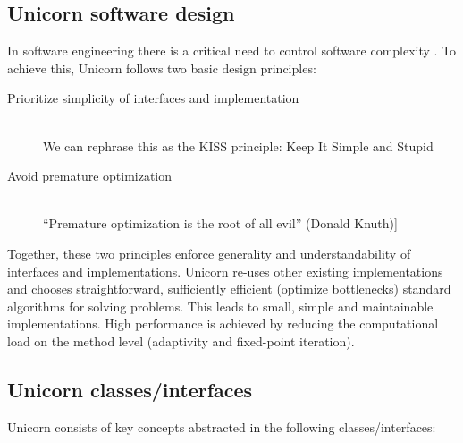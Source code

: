 \subsection{Unicorn software design}

In software engineering there is a critical need to control software
complexity \cite{Brooks1995}. To achieve this, Unicorn follows two
basic design principles:

\begin{description}
\item[Prioritize simplicity of interfaces and implementation]
\ \\
We can rephrase this as the KISS principle: Keep It Simple and Stupid
\item[Avoid premature optimization]
\ \\
``Premature optimization is the root of all evil'' (Donald Knuth)]
\end{description}

Together, these two principles enforce generality and
understandability of interfaces and implementations. Unicorn re-uses
other existing implementations and chooses straightforward,
sufficiently efficient (optimize bottlenecks) standard algorithms for
solving problems. This leads to small, simple and maintainable
implementations. High performance is achieved by reducing the
computational load on the method level (adaptivity and fixed-point
iteration). 

\subsection{Unicorn classes/interfaces}

Unicorn consists of key concepts abstracted in the following
classes/interfaces:

